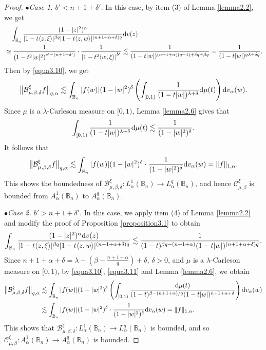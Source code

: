 \documentclass[preprint,12pt,times]{elsarticle}
\theoremstyle{definition}
\theoremstyle{remark}
\numberwithin{equation}{section}
\begin{document}
\begin{proof}
$\bullet${\it Case 1. $b'<n+1+\delta'$}. In this case, by item (3) of Lemma \ref{lemma2.2}, we get
\begin{align*}
&\quad \int_{\mathbb{B}_n}\frac{(1-|z|^2)^{\alpha}}{|1-t\langle z,\xi\rangle|^{\beta q}|1-t\langle z,w\rangle|^{(n+1+\alpha+\delta)q}}{\rm d}v(z)\\
&\simeq \frac{1}{\left(1-t^2|w|^2\right)^{c'-(n+1+\delta')}}\cdot\frac{1}{\left|1-t^2\langle w,\xi\rangle\right|^{b'}}\lesssim \frac{1}{(1-t|w|)^{(n+1+\alpha)(q-1)+\delta q+\beta q}}=\frac{1}{(1-t|w|)^{q\lambda+\delta q}}.
\end{align*}
Then by \eqref{equa3.10}, we get
\begin{align*}
\big\|\mathcal{B}_{\mu,\beta,\delta}^{\xi}f\big\|_{q,\alpha}\lesssim \int_{\mathbb{B}_n}|f(w)|(1-|w|^2)^{\delta}\left(\int_{[0,1)}\frac{1}{(1-t|w|)^{\lambda+\delta}}{\rm d}\mu(t)\right){\rm d}v_{\alpha}(w).
\end{align*}
Since $\mu$ is a $\lambda$-Carleson measure on $[0,1)$, Lemma \ref{lemma2.6} gives that
\[
    \int_{[0,1)}\frac{1}{(1-t|w|)^{\lambda+\delta}}{\rm d}\mu(t)\lesssim \frac{1}{(1-|w|^2)^{\delta}}.
\]
It follows that 
\[
    \big\|\mathcal{B}_{\mu,\beta,\delta}^{\xi}f\big\|_{q,\alpha}\lesssim \int_{\mathbb{B}_n}|f(w)|(1-|w|^2)^{\delta}\cdot \frac{1}{(1-|w|^2)^{\delta}}{\rm d}v_{\alpha}(w)=\|f\|_{1,\alpha}.
\]
This shows the boundedness of $\mathcal{B}_{\mu,\beta,\delta}^{\xi}: L_{\alpha}^1(\mathbb{B}_n)\to L_{\alpha}^q(\mathbb{B}_n)$, and hence $\mathcal{C}_{\mu,\beta}^{\xi}$ is bounded from $A_{\alpha}^1(\mathbb{B}_n)$ to $A_{\alpha}^q(\mathbb{B}_n)$.

$\bullet${\it Case 2. $b'>n+1+\delta'$}. In this case, we apply item (4) of Lemma \ref{lemma2.2} and modify the proof of Proposition \ref{proposition3.1} to obtain
\begin{equation}\label{equa3.11}
\int_{\mathbb{B}_n}\frac{(1-|z|^2)^{\alpha}{\rm d}v(z)}{|1-t\langle z,\xi\rangle|^{\beta q}|1-t\langle z,w\rangle|^{(n+1+\alpha+\delta)q}}\lesssim \frac{1}{(1-t)^{\beta q-(n+1+\alpha)}(1-t|w|)^{(n+1+\alpha+\delta)q}}.
\end{equation}
Since $n+1+\alpha+\delta=\lambda-(\beta-\frac{n+1+\alpha}{q})+\delta$, $\delta>0$, and $\mu$ is a $\lambda$-Carleson measure on $[0,1)$, by \eqref{equa3.10}, \eqref{equa3.11} and Lemma \ref{lemma2.6}, we obtain
\begin{align*}
\big\|\mathcal{B}_{\mu,\beta,\delta}^{\xi}f\big\|_{q,\alpha}&\lesssim \int_{\mathbb{B}_n}|f(w)|(1-|w|^2)^{\delta}\left(\int_{[0,1)}\frac{{\rm d}\mu(t)}{(1-t)^{\beta-(n+1+\alpha)/q}(1-t|w|)^{n+1+\alpha+\delta}}\right){\rm d}v_{\alpha}(w)\\
&\lesssim \int_{\mathbb{B}_n}|f(w)|(1-|w|^2)^{\delta}\cdot \frac{1}{(1-|w|^2)^{\delta}}{\rm d}v_{\alpha}(w)=\|f\|_{1,\alpha}.
\end{align*}
This shows that $\mathcal{B}_{\mu,\beta,\delta}^{\xi}: L_{\alpha}^1(\mathbb{B}_n)\to L_{\alpha}^q(\mathbb{B}_n)$ is bounded, and so $\mathcal{C}_{\mu,\beta}^{\xi}: A_{\alpha}^1(\mathbb{B}_n)\to A_{\alpha}^q(\mathbb{B}_n)$ is bounded.


\end{proof}
\end{document}
